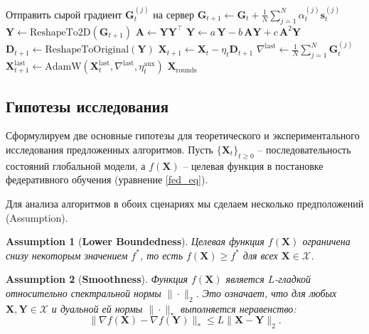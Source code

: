 \documentclass{article}
\newtheorem{assumption}{Assumption}
\begin{document}
\begin{algorithm}[H]
\begin{algorithmic}[1]
            \State Отправить сырой градиент $\mathbf{G}_t^{(j)}$ на сервер
        \EndFor
    \EndFor
    \State $\mathbf{G}_{t+1} \gets \mathbf{G}_t + \frac{1}{N} \sum_{j=1}^N \alpha_t^{(j)} \mathbf{s}_t^{(j)}$ 
        \State $\mathbf{Y} \gets \text{ReshapeTo2D}(\mathbf{G}_{t+1})$
            \State $\mathbf{A} \gets \mathbf{Y} \mathbf{Y}^\top$
            \State $\mathbf{Y} \gets a\,\mathbf{Y} - b\,\mathbf{A}\mathbf{Y} + c\,\mathbf{A}^2\mathbf{Y}$
        \EndFor
        \State $\mathbf{D}_{t+1} \gets \text{ReshapeToOriginal}(\mathbf{Y})$
        \State $\mathbf{X}_{t+1} \gets \mathbf{X}_t - \eta_t \mathbf{D}_{t+1}$ 
    \EndFor
    \State $\nabla^{\text{last}} \gets \frac{1}{N} \sum_{j=1}^N \mathbf{G}_t^{(j)}$
    \State $\mathbf{X}_{t+1}^{\text{last}} \gets \text{AdamW}(\mathbf{X}_t^{\text{last}}, \nabla^{\text{last}}, \eta_t^{\text{aux}})$ 
\EndFor
\State \Return $\mathbf{X}_{\mathrm{rounds}}$
\label{ef21_alg}
\end{algorithmic}
\end{algorithm}

\newpage
\subsection{Гипотезы исследования}\label{app:hyp}
Сформулируем две основные гипотезы для теоретического и экспериментального исследования предложенных алгоритмов. Пусть $\{\mathbf{X}_t\}_{t\ge 0}$ -- последовательность состояний глобальной модели, а $f(\mathbf{X})$ -- целевая функция в постановке федеративного обучения (уравнение \ref{fed_eq}).

Для анализа алгоритмов в обоих сценариях мы сделаем несколько предположений (Assumption). 
\begin{assumption}[\textbf{Lower Boundedness}]\label{as:1}
Целевая функция $f(\mathbf{X})$ ограничена снизу некоторым значением $f^*$, то есть $f(\mathbf{X}) \ge f^*$ для всех $\mathbf{X} \in \mathcal{X}$.
\end{assumption}

\begin{assumption}[\textbf{Smoothness}]\label{as:2}
Функция $f(\mathbf{X})$ является $L$-гладкой относительно спектральной нормы $\|\cdot\|_2$. Это означает, что для любых $\mathbf{X}, \mathbf{Y} \in \mathcal{X}$ и дуальной ей нормы $\|\cdot\|_*$ выполняется неравенство:
\begin{equation}
\|\nabla f(\mathbf{X}) - \nabla f(\mathbf{Y})\|_* \le L \|\mathbf{X} - \mathbf{Y}\|_2.
\end{equation}
\end{assumption}
\end{document}
